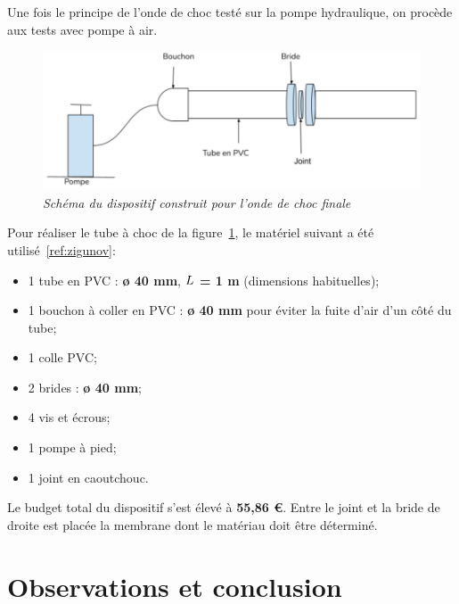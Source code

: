 \subsubsection{}
Une fois le principe de l'onde de choc testé sur la pompe hydraulique, on procède aux tests avec pompe à air.
\begin{figure}[H]
	\centering
	\includegraphics[scale = 0.4]{figures/choc_air.png}
	\caption{\small{\textit{Schéma du dispositif construit pour l'onde de choc finale}}}
	\label{fig:choc_air}
\end{figure}
Pour réaliser le tube à choc de la figure~\ref{fig:choc_air}, le matériel suivant a été utilisé~\ref{ref:zigunov}:
\begin{itemize}
	\item 1 tube en PVC : \textbf{ø 40 mm}, \textbf{$\mathnormal{L}$ = 1 m} (dimensions habituelles);
	\item 1 bouchon à coller en PVC : \textbf{ø 40 mm} pour éviter la fuite d'air d'un côté du tube;
	\item 1 colle PVC;
	\item 2 brides : \textbf{ø 40 mm};
	\item 4 vis et écrous;
	\item 1 pompe à pied;
	\item 1 joint en caoutchouc.
\end{itemize}
Le budget total du dispositif s'est élevé à \textbf{55,86 €}.
Entre le joint et la bride de droite est placée la membrane dont le matériau doit être déterminé. 
\section{Observations et conclusion}
